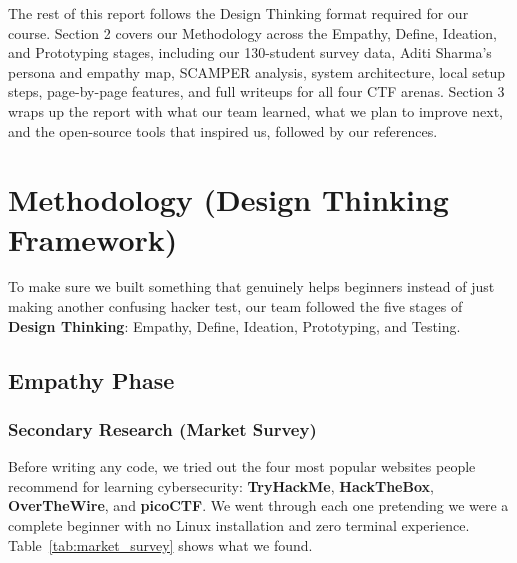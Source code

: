 \documentclass[11pt,a4paper]{article}
\begin{document}
The rest of this report follows the Design Thinking format required for our course. Section 2 covers our Methodology across the Empathy, Define, Ideation, and Prototyping stages, including our 130-student survey data, Aditi Sharma's persona and empathy map, SCAMPER analysis, system architecture, local setup steps, page-by-page features, and full writeups for all four CTF arenas. Section 3 wraps up the report with what our team learned, what we plan to improve next, and the open-source tools that inspired us, followed by our references.

\clearpage

\section{Methodology (Design Thinking Framework)}

To make sure we built something that genuinely helps beginners instead of just making another confusing hacker test, our team followed the five stages of \textbf{Design Thinking}: Empathy, Define, Ideation, Prototyping, and Testing.

\subsection{Empathy Phase}

\subsubsection{Secondary Research (Market Survey)}
Before writing any code, we tried out the four most popular websites people recommend for learning cybersecurity: \textbf{TryHackMe}, \textbf{HackTheBox}, \textbf{OverTheWire}, and \textbf{picoCTF}. We went through each one pretending we were a complete beginner with no Linux installation and zero terminal experience. Table~\ref{tab:market_survey} shows what we found.
\end{document}
